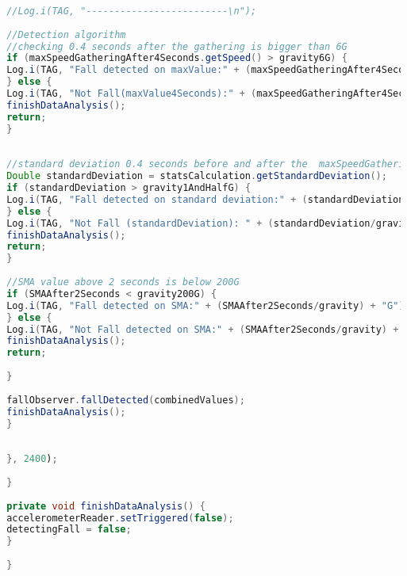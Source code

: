 \begin{lstlisting}[caption=Algoritmo de Detecção de Quedas em Java, label=cod:java, language=JAVA, frame=single, breaklines=true]
 
 //Log.i(TAG, "-------------------------\n");
 
 //Detection algorithm
 //checking 0.4 seconds after the gathering is bigger than 6G
 if (maxSpeedGatheringAfter4Seconds.getSpeed() > gravity6G) {
 Log.i(TAG, "Fall detected on maxValue:" + (maxSpeedGatheringAfter4Seconds.getSpeed()/gravity) + "G");
 } else {
 Log.i(TAG, "Not Fall(maxValue4Seconds):" + (maxSpeedGatheringAfter4Seconds.getSpeed()/gravity) + "G");
 finishDataAnalysis();
 return;
 }
 
 
 //standard deviation 0.4 seconds before and after the  maxSpeedGatheringAfter4Seconds is higher than 1.5G
 Double standardDeviation = statsCalculation.getStandardDeviation();
 if (standardDeviation > gravity1AndHalfG) {
 Log.i(TAG, "Fall detected on standard deviation:" + (standardDeviation/gravity) + "G");
 } else {
 Log.i(TAG, "Not Fall (standardDeviation): " + (standardDeviation/gravity) + "G");
 finishDataAnalysis();
 return;
 }
 
 //SMA value above 2 seconds is below 200G
 if (SMAAfter2Seconds < gravity200G) {
 Log.i(TAG, "Fall detected on SMA:" + (SMAAfter2Seconds/gravity) + "G");
 } else {
 Log.i(TAG, "Not Fall detected on SMA:" + (SMAAfter2Seconds/gravity) + "G");
 finishDataAnalysis();
 return;
 
 }
 
 fallObserver.fallDetected(combinedValues);
 finishDataAnalysis();
 }
 
 
 }, 2400);
 
 }
 
 private void finishDataAnalysis() {
 accelerometerReader.setTriggered(false);
 detectingFall = false;
 }
 
 }
 
 \end{lstlisting}